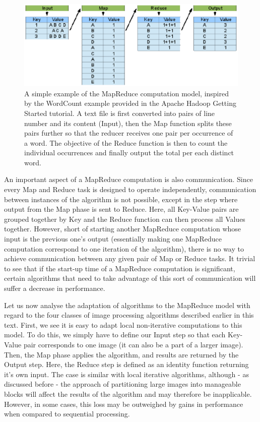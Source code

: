 \documentclass [12pt,a4paper]{report}
\begin{document}
\begin{figure}[h]
\begin{center}
\includegraphics[scale=0.5]{mapreduce.eps} %
\caption{A simple example of the MapReduce computation model, inspired by the WordCount example provided in the Apache Hadoop Getting Started tutorial. A text file is first converted into pairs of line number and its content (Input), then the Map function splits these pairs further so that the reducer receives one pair per occurrence of a word. The objective of the Reduce function is then to count the individual occurrences and finally output the total per each distinct word.}
\label{fig_mapreduce}
\end{center}
\end{figure}

An important aspect of a MapReduce computation is also communication. Since every Map and Reduce task is designed to operate independently, communication between instances of the algorithm is not possible, except in the step where output from the Map phase is sent to Reduce. Here, all Key-Value pairs are grouped together by Key and the Reduce function can then process all Values together. However, short of starting another MapReduce computation whose input is the previous one's output (essentially making one MapReduce computation correspond to one iteration of the algorithm), there is no way to achieve communication between any given pair of Map or Reduce tasks. It trivial to see that if the start-up time of a MapReduce computation is significant, certain algorithms that need to take advantage of this sort of communication will suffer a decrease in performance.

Let us now analyse the adaptation of algorithms to the MapReduce model with regard to the four classes of image processing algorithms described earlier in this text. First, we see it is easy to adapt local non-iterative computations to this model. To do this, we simply have to define our Input step so that each Key-Value pair corresponds to one image (it can also be a part of a larger image). Then, the Map phase applies the algorithm, and results are returned by the Output step. Here, the Reduce step is defined as an identity function returning it's own input. The case is similar with local iterative algorithms, although - as discussed before - the approach of partitioning large images into manageable blocks will affect the results of the algorithm and may therefore be inapplicable. However, in some cases, this loss may be outweighed by gains in performance when compared to sequential processing.
\end{document}
